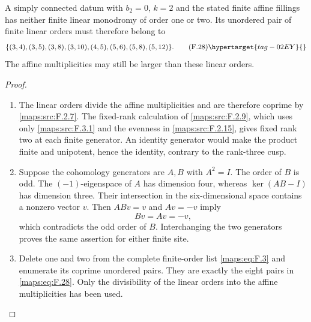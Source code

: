 \begin{proposition}\hypertarget{tag-02NZ}{}\label{maps:src:F.2.8}


A simply connected datum with $b_2=0$, $k=2$ and the stated
finite affine fillings has neither finite linear
monodromy of order one or two.  Its unordered pair of finite
linear orders must therefore belong to
\[
 \{(3,4),(3,5),(3,8),(3,10),(4,5),
       (5,6),(5,8),(5,12)\}.
 \tag{F.28}\hypertarget{tag-02EY}{}\label{maps:eq:F.28}
\]
The affine multiplicities may still be larger than these
linear orders.

\end{proposition}


\begin{proof}
\begin{enumerate}[label={$\langle1\rangle$\arabic*.}]
\item The linear orders divide the affine multiplicities and are
therefore coprime by \ref{maps:src:F.2.7}.  The fixed-rank calculation
of \ref{maps:src:F.2.9}, which uses only \ref{maps:src:F.3.1} and the
evenness in \ref{maps:src:F.2.15}, gives fixed rank two at each finite
generator.  An identity generator would make the product finite and
unipotent, hence the identity, contrary to the rank-three cusp.

\item Suppose the cohomology generators are $A,B$ with $A^2=I$.
The order of $B$ is odd.  The $(-1)$-eigenspace of $A$ has dimension
four, whereas $\ker(AB-I)$ has dimension three.  Their intersection
in the six-dimensional space contains a nonzero vector $v$.
Then $ABv=v$ and $Av=-v$ imply
\[
 Bv=Av=-v,
\]
which contradicts the odd order of $B$.  Interchanging the two
generators proves the same assertion for either finite site.

\item Delete one and two from the complete finite-order list
\eqref{maps:eq:F.3} and enumerate its coprime unordered pairs.
They are exactly the eight pairs in \eqref{maps:eq:F.28}.
Only the divisibility of the linear orders into the affine
multiplicities has been used.
\end{enumerate}
\end{proof}




